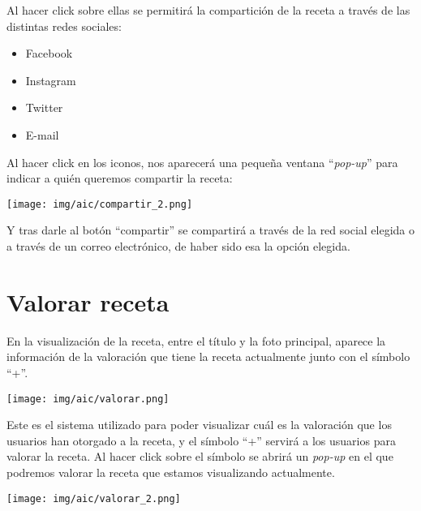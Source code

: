 \documentclass{\ClassPath/viu-tfm-template}
\begin{document}
Al hacer click sobre ellas se permitirá la compartición de la receta a través de las distintas redes sociales:

\begin{itemize}
    \item Facebook
    \item Instagram
    \item Twitter
    \item E-mail
\end{itemize}

Al hacer click en los iconos, nos aparecerá una pequeña ventana “\textit{pop-up}” para indicar a quién queremos compartir la receta:

\begin{center}
    \vspace{-10pt}
    \texttt{[image: img/aic/compartir\_2.png]}
    \vspace{-20pt}
\end{center}

Y tras darle al botón “compartir” se compartirá a través de la red social elegida o a través de un correo electrónico, de haber sido esa la opción elegida.


\section{Valorar receta}
En la visualización de la receta, entre el título y la foto principal, aparece la información de la valoración que tiene la receta actualmente junto con el símbolo “+”.

\begin{center}
    \vspace{-10pt}
    \texttt{[image: img/aic/valorar.png]}
    \vspace{-20pt}
\end{center}

Este es el sistema utilizado para poder visualizar cuál es la valoración que los usuarios han otorgado a la receta, y el símbolo “+” servirá a los usuarios para valorar la receta. Al hacer click sobre el símbolo se abrirá un \textit{pop-up} en el que podremos valorar la receta que estamos visualizando actualmente.

\begin{center}
    \vspace{-10pt}
    \texttt{[image: img/aic/valorar\_2.png]}
    \vspace{-10pt}
\end{center}
\end{document}
